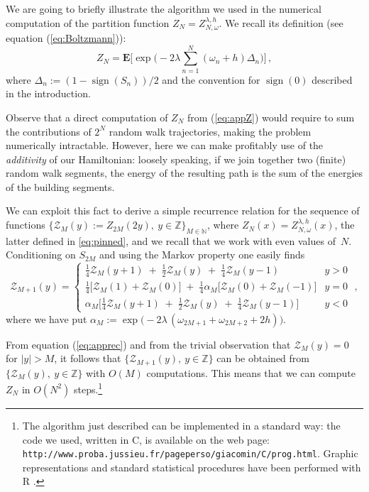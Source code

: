\documentclass[reqno,11pt]{amsart}
\numberwithin{equation}{section}
\DeclareMathOperator{\sign}{\mathrm{sign}}
\newcommand{\Z}{\mathbb{Z}}
\newcommand{\N}{\mathbb{N}}
\newcommand{\cZ}{{\ensuremath{\mathcal Z}} }
\newcommand{\bE}{{\ensuremath{\mathbf E}} }
\newcommand{\ga}{\alpha}
\newcommand{\gD}{\Delta}
\newcommand{\go}{\omega}
\newcommand{\gl}{\lambda}
\begin{document}
We are going to briefly illustrate the algorithm we used in the numerical computation of the partition function $Z_{N}=Z_{N,\go}^{\gl,h}$. We recall its definition (see equation (\ref{eq:Boltzmann})):
\begin{equation} \label{eq:appZ}
Z_N = \bE \Bigg[ \exp \Bigg( -2\gl \sum_{n=1}^N (\go_n + h) \gD_n \Bigg) \Bigg]\,,
\end{equation}
where $\gD_n := (1-\sign(S_n))/2$ and the convention for $\sign(0)$ described in the introduction.

Observe that a direct computation of $Z_N$ from (\ref{eq:appZ}) would require to sum the contributions of $2^N$ random walk trajectories, making the problem numerically intractable.
 However, here we can make profitably use of the \textsl{additivity} of our Hamiltonian:
 loosely speaking, if we join together two (finite) random walk segments, the energy of the resulting path is the sum of the energies of the building segments.

We can exploit this fact to derive a simple recurrence relation for the sequence of functions $\big\{ \cZ _{M}(y):=Z_{2M}(2y),\ y \in \Z\big\}_{M\in\N}$, where $Z_N(x) = Z_{N,\go}^{\gl,h}(x)$, the latter
defined in \eqref{eq:pinned},
and we recall that we work  with even values of~$N$. Conditioning on $S_{2M}$ and using the Markov property one easily finds
\begin{equation} \label{eq:apprec}
\cZ_{M+1} (y) = \begin{cases}
\frac14 \cZ_{M}(y+1) \;+\; \frac12 \cZ_{M}(y) \;+\; \frac14 \cZ_{M}(y-1) & y>0 \\
\frac14 \Big[ \cZ_{M}(1) + \cZ_{M}(0) \Big] \;+\; \frac14 \ga_M \Big[ \cZ_{M}(0) + \cZ_{M}(-1) \Big] & y=0 \\
\ga_M \Big[ \frac14 \cZ_{M}(y+1) \;+\; \frac12 \cZ_{M}(y) \;+\; \frac14 \cZ_{M}(y-1) \Big] & y<0
\end{cases} \;,
\end{equation}
where we have put $\ga_M := \exp\big(-2\gl\,(\go_{2M+1} + \go_{2M+2} + 2h)\big)$.

From equation (\ref{eq:apprec}) and from the trivial observation that $\cZ_{M}(y)=0$ for $|y|>M$, it follows that $\{\cZ_{M+1}(y),\ y \in \Z\}$ can be obtained from $\{\cZ_{M}(y),\ y \in \Z\}$ with $O(M)$ computations. This means that we can compute $Z_N$  in $O(N^2)$ steps.\footnote{The algorithm just described can be implemented in a standard way: the code we used, written in  C,
 is available on the web page:
 {\tt http://www.proba.jussieu.fr/pageperso/giacomin/C/prog.html}. Graphic representations and standard statistical procedures have been performed
with R \cite{cf:R}. }
\end{document}
